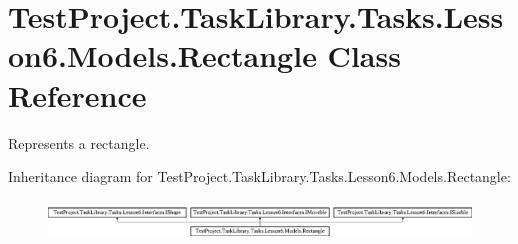 \hypertarget{class_test_project_1_1_task_library_1_1_tasks_1_1_lesson6_1_1_models_1_1_rectangle}{}\section{Test\+Project.\+Task\+Library.\+Tasks.\+Lesson6.\+Models.\+Rectangle Class Reference}
\label{class_test_project_1_1_task_library_1_1_tasks_1_1_lesson6_1_1_models_1_1_rectangle}


Represents a rectangle.  


Inheritance diagram for Test\+Project.\+Task\+Library.\+Tasks.\+Lesson6.\+Models.\+Rectangle\+:\begin{figure}[H]
\begin{center}
\leavevmode
\includegraphics[height=1.045752cm]{class_test_project_1_1_task_library_1_1_tasks_1_1_lesson6_1_1_models_1_1_rectangle}
\end{center}
\end{figure}
